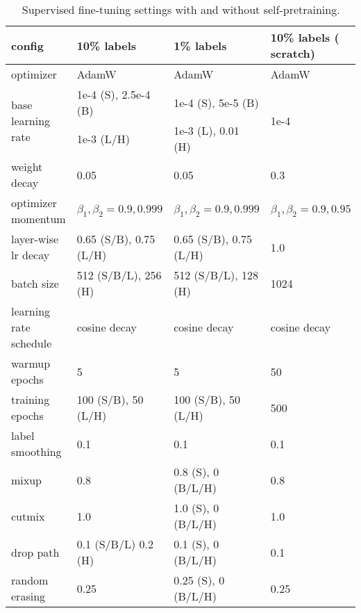 \documentclass{article}
\begin{document}
\setlength{\tabcolsep}{10pt}
\begin{table}[t]
\begin{center}\small
\begin{tabular}{l|lll}
config & 10\% labels  & 1\% labels & 10\% labels ( scratch) \\
\toprule
optimizer & AdamW & AdamW & AdamW  \\
\multirow{2}{*}{base learning rate} & 1e-4 (S), 2.5e-4 (B) & 1e-4 (S), 5e-5 (B) & \multirow{2}{*}{1e-4} \\
& 1e-3 (L/H) & 1e-3 (L), 0.01 (H) & \\
weight decay & 0.05 & 0.05 & 0.3 \\
optimizer momentum & $\beta_1, \beta_2{=}0.9, 0.999$ & $\beta_1, \beta_2{=}0.9, 0.999$ & $\beta_1, \beta_2{=}0.9, 0.95$ \\
layer-wise lr decay \cite{bao2021beit} & 0.65 (S/B), 0.75 (L/H) & 0.65 (S/B), 0.75 (L/H) & 1.0 \\
batch size & 512 (S/B/L), 256 (H) & 512 (S/B/L), 128 (H) & 1024 \\
learning rate schedule & cosine decay & cosine decay & cosine decay \\
warmup epochs & 5  & 5 & 50 \\
training epochs & 100 (S/B), 50 (L/H) & 100 (S/B), 50 (L/H) & 500 \\
label smoothing \cite{DBLP:conf/cvpr/SzegedyVISW16} & 0.1 & 0.1 & 0.1 \\
mixup \cite{DBLP:conf/iclr/ZhangCDL18} & 0.8 &  0.8 (S), 0 (B/L/H) & 0.8 \\
cutmix \cite{DBLP:conf/iccv/YunHCOYC19} & 1.0 & 1.0 (S), 0 (B/L/H) & 1.0 \\
drop path \cite{DBLP:conf/eccv/HuangSLSW16} & 0.1 (S/B/L) 0.2 (H) & 0.1 (S), 0 (B/L/H) & 0.1 \\
random erasing \cite{DBLP:conf/aaai/Zhong0KL020} & 0.25 & 0.25 (S), 0 (B/L/H) & 0.25 \\
\end{tabular}
\caption{Supervised fine-tuning settings with and without self-pretraining.}
\label{tab:impl_finetune}\vspace{-3mm}
\end{center}
\end{table}
\end{document}
